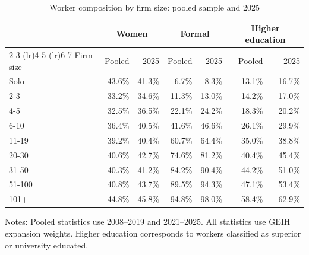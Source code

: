\begin{table}[htbp]
  \centering
  \caption{Worker composition by firm size: pooled sample and 2025}
  \label{tab:descriptive-worker-characteristics-comparison}
  \small
  \begin{tabular}{lrrrrrr}
    \toprule
    & \multicolumn{2}{c}{Women} & \multicolumn{2}{c}{Formal} & \multicolumn{2}{c}{Higher education} \\
    \cmidrule(lr){2-3} \cmidrule(lr){4-5} \cmidrule(lr){6-7}
    Firm size & Pooled & 2025 & Pooled & 2025 & Pooled & 2025 \\
    \midrule
    Solo & 43.6\% & 41.3\% & 6.7\% & 8.3\% & 13.1\% & 16.7\% \\
    2-3 & 33.2\% & 34.6\% & 11.3\% & 13.0\% & 14.2\% & 17.0\% \\
    4-5 & 32.5\% & 36.5\% & 22.1\% & 24.2\% & 18.3\% & 20.2\% \\
    6-10 & 36.4\% & 40.5\% & 41.6\% & 46.6\% & 26.1\% & 29.9\% \\
    11-19 & 39.2\% & 40.4\% & 60.7\% & 64.4\% & 35.0\% & 38.8\% \\
    20-30 & 40.6\% & 42.7\% & 74.6\% & 81.2\% & 40.4\% & 45.4\% \\
    31-50 & 40.3\% & 41.2\% & 84.2\% & 90.4\% & 44.2\% & 51.0\% \\
    51-100 & 40.8\% & 43.7\% & 89.5\% & 94.3\% & 47.1\% & 53.4\% \\
    101+ & 44.8\% & 45.8\% & 94.8\% & 98.0\% & 58.4\% & 62.9\% \\
    \bottomrule
  \end{tabular}
  \vspace{0.3em}
  \begin{minipage}{0.95\textwidth}
  \footnotesize
  Notes: Pooled statistics use 2008--2019 and 2021--2025. All statistics use GEIH expansion weights. Higher education corresponds to workers classified as superior or university educated.
  \end{minipage}
\end{table}
